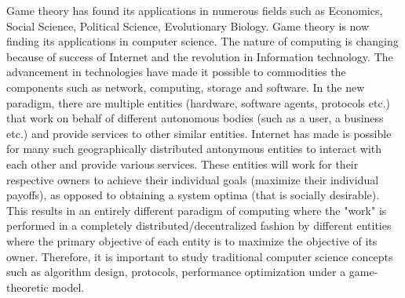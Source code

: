 Game theory has found its applications in numerous fields such as Economics, Social Science, Political Science, Evolutionary Biology. Game theory is now finding its applications in computer science. The nature of computing is changing because of success of Internet and the revolution in Information technology. The advancement in technologies have made it possible to commodities the components such as network, computing, storage and software. In the new paradigm, there are multiple entities (hardware, software agents, protocols etc.) that work on behalf of different autonomous bodies (such as a user, a business etc.) and provide services to other similar entities. Internet has made is possible for many such geographically distributed antonymous entities to interact with each other and provide various services. These entities will work  for their respective owners to achieve their individual goals (maximize their individual payoffs), as opposed to obtaining a system optima (that is socially desirable). This results in an entirely different paradigm of computing where the "work" is performed in a completely distributed/decentralized fashion by different entities where the primary objective of each entity  is to maximize the objective of its owner. Therefore, it is important to study traditional computer science concepts such as algorithm design, protocols, performance optimization under a game-theoretic model.  